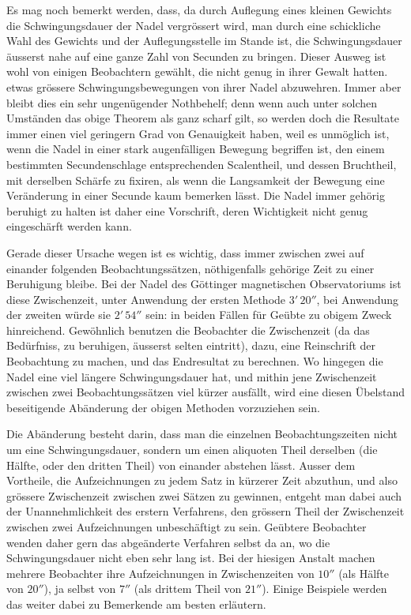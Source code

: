 Es mag noch bemerkt werden, dass, da durch Auflegung eines kleinen Gewichts die Schwingungsdauer der Nadel vergrössert wird, man durch eine schickliche Wahl des Gewichts und der Auflegungsstelle im Stande ist, die Schwingungsdauer äusserst nahe auf eine ganze Zahl von Secunden zu bringen. Dieser Ausweg ist wohl von einigen Beobachtern gewählt, die nicht genug in ihrer Gewalt hatten. etwas grössere Schwingungsbewegungen von ihrer Nadel abzuwehren. Immer aber bleibt dies ein sehr ungenügender Nothbehelf; denn wenn auch unter solchen Umständen das obige Theorem als ganz scharf gilt, so werden doch die Resultate immer einen viel geringern Grad von Genauigkeit haben, weil es unmöglich ist, wenn die Nadel in einer stark augenfälligen Bewegung begriffen ist, den einem bestimmten Secundenschlage entsprechenden Scalentheil, und dessen Bruchtheil, mit derselben Schärfe zu fixiren, als wenn die Langsamkeit der Bewegung eine Veränderung in einer Secunde kaum bemerken lässt. Die Nadel immer gehörig beruhigt zu halten ist daher eine Vorschrift, deren Wichtigkeit nicht genug eingeschärft werden kann.

Gerade dieser Ursache wegen ist es wichtig, dass immer zwischen zwei auf einander folgenden Beobachtungssätzen, nöthigenfalls gehörige Zeit zu einer Beruhigung bleibe. Bei der Nadel des Göttinger magnetischen Observatoriums ist diese Zwischenzeit, unter Anwendung der ersten Methode $3'\,20''$, bei Anwendung der zweiten würde sie $2'\,54''$ sein: in beiden Fällen für Geübte zu obigem Zweck hinreichend. Gewöhnlich benutzen die Beobachter die Zwischenzeit (da
das Bedürfniss, zu beruhigen, äusserst selten eintritt), dazu, eine Reinschrift der Beobachtung zu machen, und das Endresultat zu berechnen. Wo hingegen die Nadel eine viel längere Schwingungsdauer hat, und mithin jene Zwischenzeit zwischen zwei Beobachtungssätzen viel kürzer ausfällt, wird eine diesen Übelstand beseitigende Abänderung der obigen Methoden vorzuziehen sein.

Die Abänderung besteht darin, dass man die einzelnen Beobachtungszeiten nicht um eine Schwingungsdauer, sondern um einen aliquoten Theil derselben (die Hälfte, oder den dritten Theil) von einander abstehen lässt. Ausser dem Vortheile, die Aufzeichnungen zu jedem Satz in kürzerer Zeit abzuthun, und also grössere Zwischenzeit zwischen zwei Sätzen zu gewinnen, entgeht man dabei auch der Unannehmlichkeit des erstern Verfahrens, den grössern Theil der Zwischenzeit zwischen zwei Aufzeichnungen unbeschäftigt zu sein. Geübtere Beobachter wenden daher gern das abgeänderte Verfahren selbst da an, wo die Schwingungsdauer nicht eben sehr lang ist. Bei der hiesigen Anstalt machen mehrere Beobachter ihre Aufzeichnungen in Zwischenzeiten von $10''$ (als Hälfte von $20''$), ja selbst von $7''$ (als drittem Theil von $21''$). Einige Beispiele werden das weiter dabei zu Bemerkende am besten erläutern.

